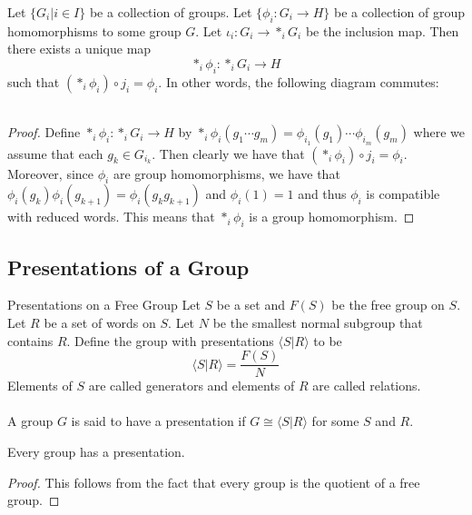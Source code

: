 \documentclass[a4paper]{article}
\begin{document}
\begin{lmm}{}{} Let $\{G_i|i\in I\}$ be a collection of groups. Let $\{\phi_i:G_i\to H\}$ be a collection of group homomorphisms to some group $G$. Let $\iota_i:G_i\to\ast_iG_i$ be the inclusion map. Then there exists a unique map $$\ast_i\phi_i:\ast_i G_i\to H$$ such that $(\ast_i\phi_i)\circ j_i=\phi_i$. In other words, the following diagram commutes: \\~\\
 \tcbline
\begin{proof}
Define $\ast_i\phi_i:\ast_iG_i\to H$ by $\ast_i\phi_i(g_1\cdots g_m)=\phi_{i_1}(g_1)\cdots\phi_{i_m}(g_m)$ where we assume that each $g_k\in G_{i_k}$. Then clearly we have that $(\ast_i\phi_i)\circ j_i=\phi_i$. Moreover, since $\phi_i$ are group homomorphisms, we have that $\phi_i(g_k)\phi_i(g_{k+1})=\phi_i(g_kg_{k+1})$ and $\phi_i(1)=1$ and thus $\phi_i$ is compatible with reduced words. This means that $\ast_i\phi_i$ is a group homomorphism. 
\end{proof}
\end{lmm}

\subsection{Presentations of a Group}
\begin{defn}{Presentations on a Free Group}{} Let $S$ be a set and $F(S)$ be the free group on $S$. Let $R$ be a set of words on $S$. Let $N$ be the smallest normal subgroup that contains $R$. Define the group with presentations $\langle S|R\rangle$ to be $$\langle S|R\rangle=\frac{F(S)}{N}$$ Elements of $S$ are called generators and elements of $R$ are called relations. \\~\\
A group $G$ is said to have a presentation if $G\cong\langle S|R\rangle$ for some $S$ and $R$. 
\end{defn}

\begin{thm}{}{} Every group has a presentation. \tcbline
\begin{proof}
This follows from the fact that every group is the quotient of a free group. 
\end{proof}
\end{thm}
\end{document}
